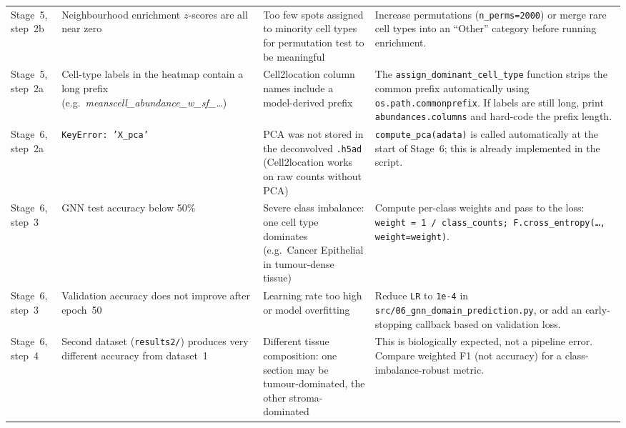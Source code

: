 \documentclass[12pt, a4paper]{article}
\begin{document}
\begin{longtable}{p{1.6cm} p{3.8cm} p{3.8cm} p{5.4cm}}
Stage~5, step~2b &
Neighbourhood enrichment $z$-scores are all near zero &
Too few spots assigned to minority cell types for permutation test
to be meaningful &
Increase permutations (\texttt{n\_perms=2000}) or merge rare cell
types into an ``Other'' category before running enrichment. \\[4pt]

Stage~5, step~2a &
Cell-type labels in the heatmap contain a long prefix
(e.g.\ \textit{meanscell\_abundance\_w\_sf\_\ldots}) &
Cell2location column names include a model-derived prefix &
The \texttt{assign\_dominant\_cell\_type} function strips the common
prefix automatically using \texttt{os.path.commonprefix}.
If labels are still long, print \texttt{abundances.columns} and
hard-code the prefix length. \\[4pt]

Stage~6, step~2a &
\texttt{KeyError: 'X\_pca'} &
PCA was not stored in the deconvolved \texttt{.h5ad} (Cell2location
works on raw counts without PCA) &
\texttt{compute\_pca(adata)} is called automatically at the start of
Stage~6; this is already implemented in the script. \\[4pt]

Stage~6, step~3 &
GNN test accuracy below 50\% &
Severe class imbalance: one cell type dominates (e.g.\ Cancer
Epithelial in tumour-dense tissue) &
Compute per-class weights and pass to the loss:
\texttt{weight = 1 / class\_counts; F.cross\_entropy(\ldots, weight=weight)}. \\[4pt]

Stage~6, step~3 &
Validation accuracy does not improve after epoch~50 &
Learning rate too high or model overfitting &
Reduce \texttt{LR} to \texttt{1e-4} in
\texttt{src/06\_gnn\_domain\_prediction.py}, or add an early-stopping
callback based on validation loss. \\[4pt]

Stage~6, step~4 &
Second dataset (\texttt{results2/}) produces very different accuracy
from dataset~1 &
Different tissue composition: one section may be tumour-dominated,
the other stroma-dominated &
This is biologically expected, not a pipeline error. Compare
weighted F1 (not accuracy) for a class-imbalance-robust metric. \\[4pt]

\end{longtable}
\endgroup

\end{document}
